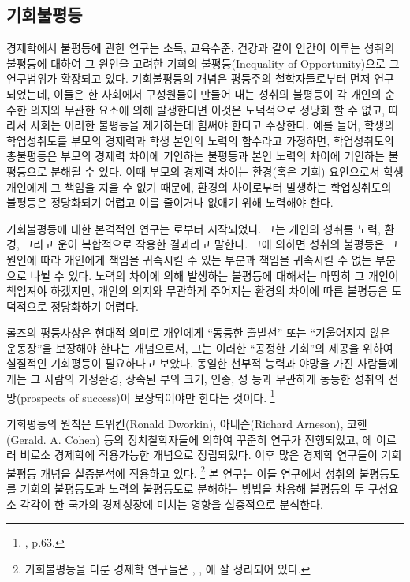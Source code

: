 \subsection{기회불평등}

경제학에서 불평등에 관한 연구는 소득, 교육수준, 건강과 같이 인간이 이루는 성취의 불평등에 대하여 그 윈인을 고려한 기회의 불평등(Inequality of Opportunity)으로 그 연구범위가 확장되고 있다.
기회불평등의 개념은 평등주의 철학자들로부터 먼저 연구되었는데, 이들은 한 사회에서 구성원들이 만들어 내는 성취의 불평등이 각 개인의 순수한 의지와 무관한 요소에 의해 발생한다면 이것은 도덕적으로 정당화 할 수 없고, 따라서 사회는 이러한 불평등을 제거하는데 힘써야 한다고 주장한다.
예를 들어, 학생의 학업성취도를 부모의 경제력과 학생 본인의 노력의 함수라고 가정하면, 학업성취도의 총불평등은 부모의 경제력 차이에 기인하는 불평등과 본인 노력의 차이에 기인하는 불평등으로 분해될 수 있다.
이때 부모의 경제력 차이는 환경(혹은 기회) 요인으로서 학생 개인에게 그 책임을 지을 수 없기 때문에, 환경의 차이로부터 발생하는 학업성취도의 불평등은 정당화되기 어렵고 이를 줄이거나 없애기 위해 노력해야 한다.

기회불평등에 대한 본격적인 연구는 \citet{Rawls99}로부터 시작되었다.
 그는 개인의 성취를 노력, 환경, 그리고 운이 복합적으로 작용한 결과라고 말한다.
 그에 의하면 성취의 불평등은 그 원인에 따라 개인에게 책임을 귀속시킬 수 있는 부분과 책임을 귀속시킬 수 없는 부분으로 나뉠 수 있다.
 노력의 차이에 의해 발생하는 불평등에 대해서는 마땅히 그 개인이 책임져야 하겠지만, 개인의 의지와 무관하게 주어지는 환경의 차이에 따른 불평등은 도덕적으로 정당화하기 어렵다.
 
롤즈의 평등사상은 현대적 의미로 개인에게 “동등한 출발선” 또는 “기울어지지 않은 운동장”을 보장해야 한다는 개념으로서, 그는 이러한 “공정한 기회”의 제공을 위하여 실질적인 기회평등이 필요하다고 보았다.
동일한 천부적 능력과 야망을 가진 사람들에게는 그 사람의 가정환경, 상속된 부의 크기, 인종, 성 등과 무관하게 동등한 성취의 전망(prospects of success)이 보장되어야만 한다는 것이다.
\footnote{\citet{Rawls99}, p.63.}

기회평등의 원칙은 드워킨(Ronald Dworkin), 아네슨(Richard Arneson), 코헨(Gerald. A. Cohen) 등의 정치철학자들에 의하여 꾸준히 연구가 진행되었고, \citet{Roemer98}에 이르러 비로소 경제학에 적용가능한 개념으로 정립되었다.
\citet{Roemer98} 이후 많은 경제학 연구들이 기회불평등 개념을 실증분석에 적용하고 있다.
\footnote{기회불평등을 다룬 경제학 연구들은 \citet{rnv12}, \citet{fnp15}, \citet{rnt16}에 잘 정리되어 있다.}
본 연구는 이들 연구에서 성취의 불평등도를 기회의 불평등도과 노력의 불평등도로 분해하는 방법을 차용해 불평등의 두 구성요소 각각이 한 국가의 경제성장에 미치는 영향을 실증적으로 분석한다.

